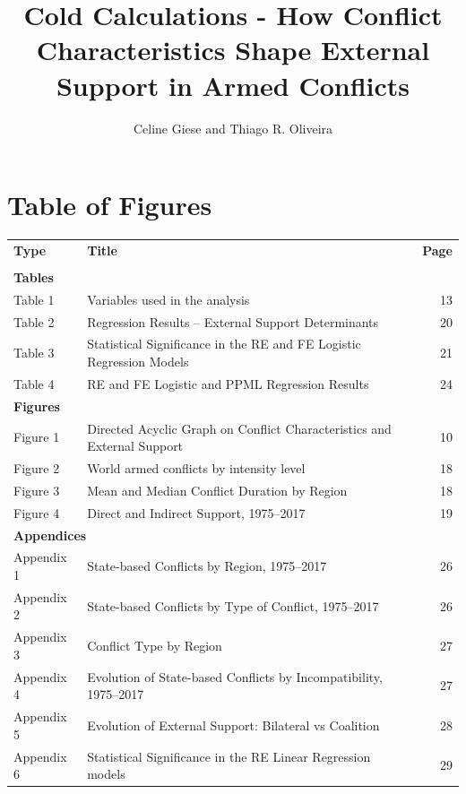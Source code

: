 \documentclass[
]{article}
\title{Cold Calculations - How Conflict Characteristics Shape External
Support in Armed Conflicts}
\author{Celine Giese and Thiago R. Oliveira}
\date{}
\begin{document}
\maketitle

{
\setcounter{tocdepth}{2}
\tableofcontents
}
\newpage

\section{Table of Figures}\label{table-of-figures}

\begin{center}
\begin{tabular}{l l r}
\textbf{Type} & \textbf{Title} & \textbf{Page} \\

\\[-0.3em]
\multicolumn{3}{l}{\textbf{Tables}} \\[0.3em]
Table 1 & Variables used in the analysis & 13 \\
Table 2 & Regression Results – External Support Determinants & 20 \\
Table 3 & Statistical Significance in the RE and FE Logistic Regression Models & 21 \\
Table 4 & RE and FE Logistic and PPML Regression Results & 24 \\[1.2em]

\multicolumn{3}{l}{\textbf{Figures}} \\[0.3em]
Figure 1 & Directed Acyclic Graph on Conflict Characteristics and External Support & 10 \\
Figure 2 & World armed conflicts by intensity level & 18 \\[0.3em]
Figure 3 & Mean and Median Conflict Duration by Region & 18 \\
Figure 4 & Direct and Indirect Support, 1975–2017 & 19 \\[1.2em]

\multicolumn{3}{l}{\textbf{Appendices}} \\[0.3em]
Appendix 1 & State-based Conflicts by Region, 1975–2017 & 26 \\
Appendix 2 & State-based Conflicts by Type of Conflict, 1975–2017 & 26 \\
Appendix 3 & Conflict Type by Region & 27 \\
Appendix 4 & Evolution of State-based Conflicts by Incompatibility, 1975–2017 & 27 \\
Appendix 5 & Evolution of External Support: Bilateral vs Coalition & 28 \\
Appendix 6 & Statistical Significance in the RE Linear Regression models & 29 \\

\end{tabular}
\end{center}
\end{document}
